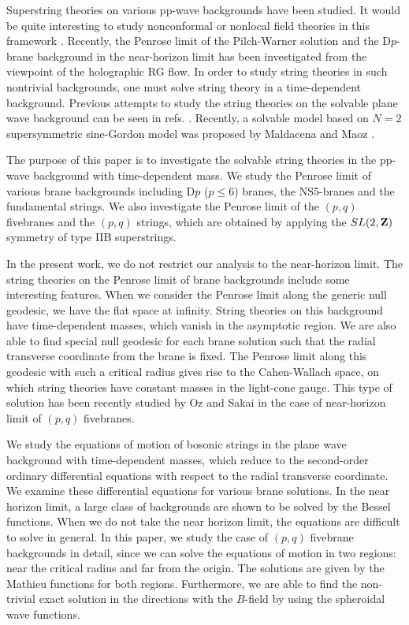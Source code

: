 \documentclass[a4paper,12pt]{article}
\begin{document}
Superstring theories on various pp-wave 
backgrounds have 
been studied.
It would be quite interesting to study nonconformal or nonlocal
field theories in this framework 
\cite{GuNuMaSc,ZaSo,HuRaVe,AlKu2,BiKuPa,AlPa,HaSe}. 
Recently, the Penrose limit of 
the Pilch-Warner solution \cite{CoHaKeWa,GiPaSo,BrJoLoMy} 
and the D$p$-brane background in the near-horizon
limit \cite{GiPaSo} has been investigated from the viewpoint of the 
holographic RG flow.
In order to study string theories in such nontrivial backgrounds, one
must solve string theory in a time-dependent background.
Previous attempts to study
the string theories on the solvable plane wave
background can be seen in refs. \cite{AmKl,HoSte,VeSa,JoNu,KiKoLu}.
Recently, a solvable model based on $N=2$ supersymmetric sine-Gordon model 
was  proposed by Maldacena and Maoz \cite{MaMa}.

The purpose of this paper is to investigate the solvable string theories
in the pp-wave background with time-dependent mass.
We study the Penrose limit of various brane backgrounds including 
D$p$ ($p\leq 6$) branes, the NS5-branes and the fundamental strings.
We also
investigate the Penrose limit of the $(p,q)$ fivebranes and the 
$(p,q)$ strings, which are obtained by 
applying the $SL(2,{\bf Z})$ symmetry of type IIB superstrings.

In the present work, we do not restrict our analysis to  
the near-horizon limit.
The string theories on the Penrose limit of brane backgrounds include 
some interesting features.
When we consider the Penrose limit along the generic null geodesic, 
we have the flat space at infinity.
String theories on this background have time-dependent masses, 
which vanish in the asymptotic region.
We are also able to find special null geodesic for each brane solution 
such that the radial transverse 
coordinate from the brane is fixed. 
The Penrose limit along this geodesic with such a critical radius
gives rise to the Cahen-Wallach
space,
on which string theories have constant masses in the light-cone gauge.
This type of solution has been recently studied by Oz and Sakai 
\cite{OzSa} in the case of near-horizon limit of $(p,q)$ fivebranes.

We study the equations of motion of bosonic
strings in the plane wave background
with time-dependent masses, which reduce to the second-order ordinary
differential equations with respect to the radial transverse coordinate. 
We examine these differential equations 
for various brane solutions.
In the near horizon limit, a large class of backgrounds are shown to
be solved by the Bessel functions.
When we do not take the near horizon limit, the equations are difficult
to solve in general. 
In this paper, we study the case of 
$(p,q)$ fivebrane backgrounds in detail, since  we can solve 
the equations of motion in two regions: near the critical
radius and far from the origin.
The solutions are given by the Mathieu functions for both regions.
Furthermore, we are able to find the non-trivial exact solution 
in the directions with the $B$-field by using the spheroidal wave functions.
\end{document}
